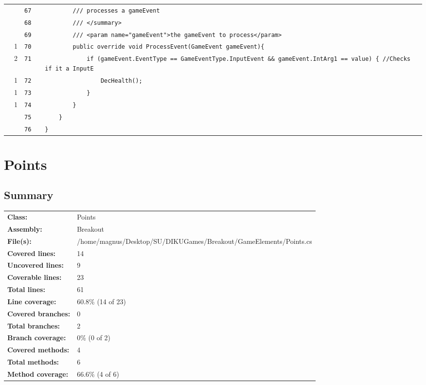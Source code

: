 \documentclass[a4paper,landscape,10pt]{article}
\begin{document}
\begin{longtable}[l]{lrrll}
\cellcolor{gray} &  & \verb~67~ & & \verb~        /// processes a gameEvent~\\
\cellcolor{gray} &  & \verb~68~ & & \verb~        /// </summary>~\\
\cellcolor{gray} &  & \verb~69~ & & \verb~        /// <param name="gameEvent">the gameEvent to process</param>~\\
\cellcolor{green} & 1 & \verb~70~ & & \verb~        public override void ProcessEvent(GameEvent gameEvent){~\\
\cellcolor{orange} & 2 & \verb~71~ & & \verb~            if (gameEvent.EventType == GameEventType.InputEvent && gameEvent.IntArg1 == value) { //Checks if it a InputE~\\
\cellcolor{green} & 1 & \verb~72~ & & \verb~                DecHealth();~\\
\cellcolor{green} & 1 & \verb~73~ & & \verb~            }~\\
\cellcolor{green} & 1 & \verb~74~ & & \verb~        }~\\
\cellcolor{gray} &  & \verb~75~ & & \verb~    }~\\
\cellcolor{gray} &  & \verb~76~ & & \verb~}~\\
\end{longtable}
\newpage
\section{Points}
\subsection{Summary}
\begin{longtable}[l]{ll}
\textbf{Class:} & Points\\
\textbf{Assembly:} & Breakout\\
\textbf{File(s):} & \begin{minipage}[t]{12cm}{/home/magnus/Desktop/SU/DIKUGames/Breakout/GameElements/Points.cs}\end{minipage} \\
\textbf{Covered lines:} & 14\\
\textbf{Uncovered lines:} & 9\\
\textbf{Coverable lines:} & 23\\
\textbf{Total lines:} & 61\\
\textbf{Line coverage:} & 60.8\% (14 of 23)\\
\textbf{Covered branches:} & 0\\
\textbf{Total branches:} & 2\\
\textbf{Branch coverage:} & 0\% (0 of 2)\\
\textbf{Covered methods:} & 4\\
\textbf{Total methods:} & 6\\
\textbf{Method coverage:} & 66.6\% (4 of 6)\\
\end{longtable}
\end{document}
